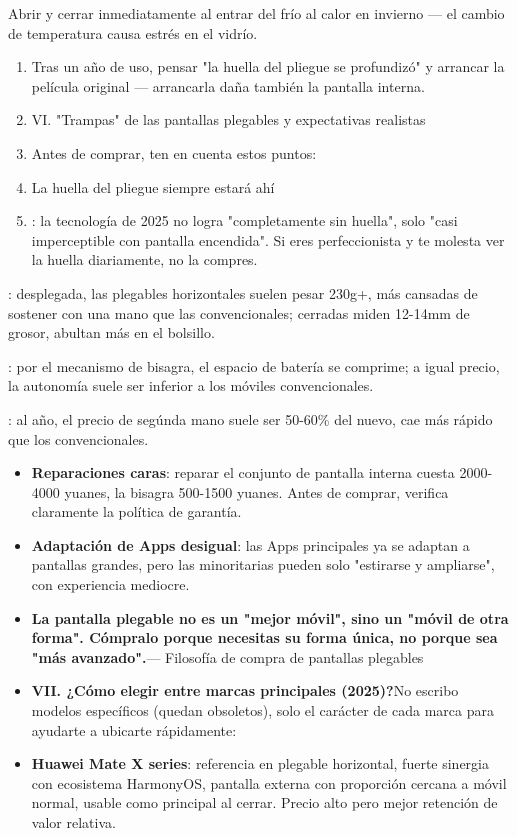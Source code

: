 \begin{tcbpractice}{Abrir y cerrar inmediatamente al entrar del frío al calor en invierno — el cambio de temperatura causa estrés en el vidrío.}
\begin{enumerate}
  \item Tras un año de uso, pensar "la huella del pliegue se profundizó" y arrancar la película original — arrancarla daña también la pantalla interna.
  \item VI. "Trampas" de las pantallas plegables y expectativas realistas
  \item Antes de comprar, ten en cuenta estos puntos:
  \item La huella del pliegue siempre estará ahí
  \item : la tecnología de 2025 no logra "completamente sin huella", solo "casi imperceptible con pantalla encendida". Si eres perfeccionista y te molesta ver la huella diariamente, no la compres.
\end{enumerate}

\end{tcbpractice}


: desplegada, las plegables horizontales suelen pesar 230g+, más cansadas de sostener con una mano que las convencionales; cerradas miden 12-14mm de grosor, abultan más en el bolsillo.


: por el mecanismo de bisagra, el espacio de batería se comprime; a igual precio, la autonomía suele ser inferior a los móviles convencionales.


: al año, el precio de segúnda mano suele ser 50-60\% del nuevo, cae más rápido que los convencionales.

\begin{itemize}
  \item \textbf{Reparaciones caras}: reparar el conjunto de pantalla interna cuesta 2000-4000 yuanes, la bisagra 500-1500 yuanes. Antes de comprar, verifica claramente la política de garantía.
  \item \textbf{Adaptación de Apps desigual}: las Apps principales ya se adaptan a pantallas grandes, pero las minoritarias pueden solo "estirarse y ampliarse", con experiencia mediocre.
  \item \textbf{La pantalla plegable no es un "mejor móvil", sino un "móvil de otra forma". Cómpralo porque necesitas su forma única, no porque sea "más avanzado".}— Filosofía de compra de pantallas plegables
  \item \textbf{VII. ¿Cómo elegir entre marcas principales (2025)?}No escribo modelos específicos (quedan obsoletos), solo el carácter de cada marca para ayudarte a ubicarte rápidamente:
  \item \textbf{Huawei Mate X series}: referencia en plegable horizontal, fuerte sinergia con ecosistema HarmonyOS, pantalla externa con proporción cercana a móvil normal, usable como principal al cerrar. Precio alto pero mejor retención de valor relativa.
\end{itemize}

